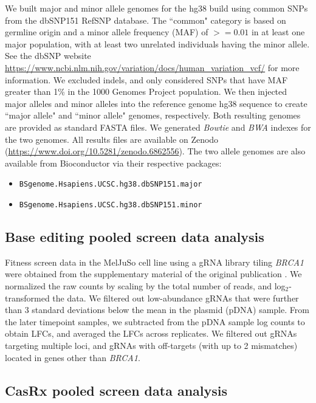 \documentclass[pdftex,english,10pt]{article}
\begin{document}
{We built major and minor allele genomes for the hg38 build using common SNPs from the dbSNP151 RefSNP database. The ``common" category is based on germline origin and a minor allele frequency (MAF) of $>=0.01$ in at least one major population, with at least two unrelated individuals having the minor allele. See the dbSNP website \url{https://www.ncbi.nlm.nih.gov/variation/docs/human_variation_vcf/} for more information. We excluded indels, and only considered SNPs that have MAF greater than 1\% in the 1000 Genomes Project population. We then injected major alleles and minor alleles into the reference genome hg38 sequence to create ``major allele" and ``minor allele" genomes, respectively. Both resulting genomes are provided as standard FASTA files. We generated \textit{Bowtie} and \textit{BWA} indexes for the two genomes. All results files are available on Zenodo (\url{https://www.doi.org/10.5281/zenodo.6862556}). The two allele genomes are also available from Bioconductor via their respective packages:

\begin{itemize}
\item \texttt{BSgenome.Hsapiens.UCSC.hg38.dbSNP151.major} \citep{bsgenome_major}
\item \texttt{BSgenome.Hsapiens.UCSC.hg38.dbSNP151.minor} \citep{bsgenome_minor}
\end{itemize}


\subsection*{Base editing pooled screen data analysis}

Fitness screen data in the MelJuSo cell line using a gRNA library tiling \textit{BRCA1} were obtained from the supplementary material of the original publication \citep{hanna2021massively}. We normalized the raw counts by scaling by the total number of reads, and log$_2$-transformed the data. We filtered out low-abundance gRNAs that were further than 3 standard deviations below the mean in the plasmid (pDNA) sample. From the later timepoint samples, we subtracted from the pDNA sample log counts to obtain LFCs, and averaged the LFCs across replicates. We filtered out gRNAs targeting multiple loci, and gRNAs with off-targets (with up to 2 mismatches) located in genes other than \textit{BRCA1}.  




\subsection*{CasRx pooled screen data analysis}

}
\end{document}
